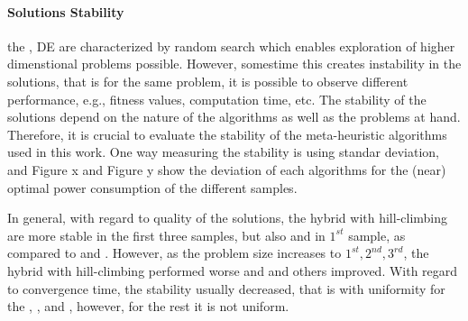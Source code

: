 \paragraph{Solutions Stability} the \pso, DE are characterized by random search which enables exploration of higher dimenstional problems possible. However, somestime this creates instability in the solutions, that is for the same problem, it is possible to observe different performance, e.g., fitness values, computation time, etc. The stability of the solutions depend on the nature of the algorithms as well as the problems at hand. Therefore, it is crucial to evaluate the stability of the meta-heuristic algorithms used in this work. One way measuring the stability is using standar deviation, and Figure x and Figure y show the deviation of each algorithms for the (near) optimal power consumption of the different samples.

In general, with regard to quality of the solutions, the hybrid \pso{} with hill-climbing are more stable in the first three samples, but also \de and \lpso{} in $1^{st}$ sample, as compared to \pso{} and \depso. However, as the problem size increases to $1^{st},2^{nd}, 3^{rd}$,  the hybrid \pso{} with hill-climbing performed worse and \pso{} and others improved. With regard to convergence time, the stability usually decreased, that is with uniformity for the \pso, \de, \hcpso and \shpso, however, for the rest it is not uniform.

